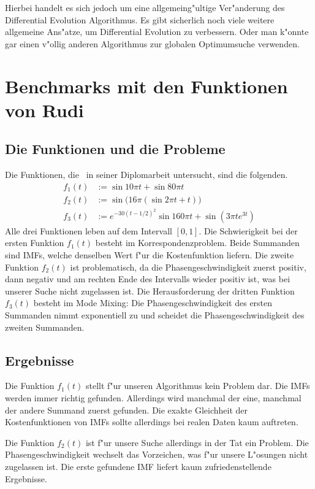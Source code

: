 \documentclass[a4paper]{scrartcl}
\begin{document}
Hierbei handelt es sich jedoch um eine allgemeing"ultige Ver"anderung des Differential Evolution Algorithmus. Es gibt sicherlich noch viele weitere allgemeine Ans"atze, um Differential Evolution zu verbessern. Oder man k"onnte gar einen v"ollig anderen Algorithmus zur globalen Optimumsuche verwenden. 


\section{Benchmarks mit den Funktionen von Rudi}

\subsection{Die Funktionen und die Probleme}

Die Funktionen, die~\citeauthor{rudi2010} in seiner Diplomarbeit \citep[S.~28--32]{rudi2010} untersucht, sind die folgenden.
\begin{align*}
f_1(t) &:= \sin 10\pi t + \sin 80\pi t \\
f_2(t) &:= \sin\big(16\pi(\sin 2\pi t+t)\big) \\
f_3(t) &:= e^{-30(t-1/2)^2}\sin 160\pi t + \sin(3\pi te^{3t})
\end{align*}
Alle drei Funktionen leben auf dem Intervall $[0,1]$. Die Schwierigkeit bei der ersten Funktion $f_1(t)$ besteht im Korrespondenzproblem. Beide Summanden sind IMFs, welche denselben Wert f"ur die Kostenfunktion liefern. Die zweite Funktion $f_2(t)$ ist problematisch, da die Phasengeschwindigkeit zuerst positiv, dann negativ und am rechten Ende des Intervalls wieder positiv ist, was bei unserer Suche nicht zugelassen ist. Die Herausforderung der dritten Funktion $f_3(t)$ besteht im Mode Mixing: Die Phasengeschwindigkeit des ersten Summanden nimmt exponentiell zu und scheidet die Phasengeschwindigkeit des zweiten Summanden. 


\subsection{Ergebnisse}

Die Funktion $f_1(t)$ stellt f"ur unseren Algorithmus kein Problem dar. Die IMFs werden immer richtig gefunden. Allerdings wird manchmal der eine, manchmal der andere Summand zuerst gefunden. Die exakte Gleichheit der Kostenfunktionen von IMFs sollte allerdings bei realen Daten kaum auftreten. 

Die Funktion $f_2(t)$ ist f"ur unsere Suche allerdings in der Tat ein Problem. Die Phasengeschwindigkeit wechselt das Vorzeichen, was f"ur unsere L"osungen nicht zugelassen ist. Die erste gefundene IMF liefert kaum zufriedenstellende Ergebnisse. 
\end{document}
